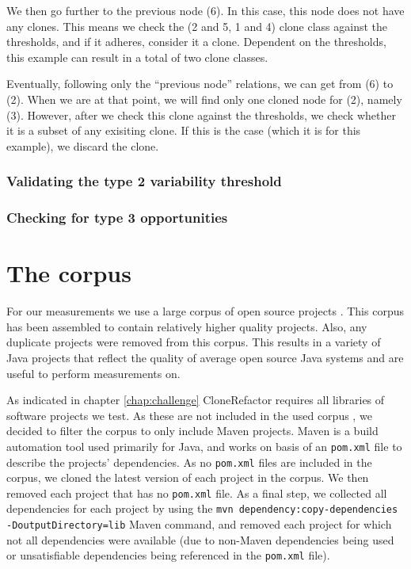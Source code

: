 We then go further to the previous node (6). In this case, this node does not have any clones. This means we check the (2 and 5, 1 and 4) clone class against the thresholds, and if it adheres, consider it a clone. Dependent on the thresholds, this example can result in a total of two clone classes.

Eventually, following only the ``previous node'' relations, we can get from (6) to (2). When we are at that point, we will find only one cloned node for (2), namely (3). However, after we check this clone against the thresholds, we check whether it is a subset of any exisiting clone. If this is the case (which it is for this example), we discard the clone.

\subsubsection{Validating the type 2 variability threshold}


\subsubsection{Checking for type 3 opportunities}


\section{The corpus}\label{chap:corpus}
For our measurements we use a large corpus of open source projects \cite{githubCorpus2013}. This corpus has been assembled to contain relatively higher quality projects. Also, any duplicate projects were removed from this corpus. This results in a variety of Java projects that reflect the quality of average open source Java systems and are useful to perform measurements on.

As indicated in chapter \ref{chap:challenge} CloneRefactor requires all libraries of software projects we test. As these are not included in the used corpus \cite{githubCorpus2013}, we decided to filter the corpus to only include Maven projects. Maven is a build automation tool used primarily for Java, and works on basis of an \texttt{pom.xml} file to describe the projects' dependencies. As no \texttt{pom.xml} files are included in the corpus, we cloned the latest version of each project in the corpus. We then removed each project that has no \texttt{pom.xml} file. As a final step, we collected all dependencies for each project by using the \texttt{mvn dependency:copy-dependencies -DoutputDirectory=lib} Maven command, and removed each project for which not all dependencies were available (due to non-Maven dependencies being used or unsatisfiable dependencies being referenced in the \texttt{pom.xml} file).

